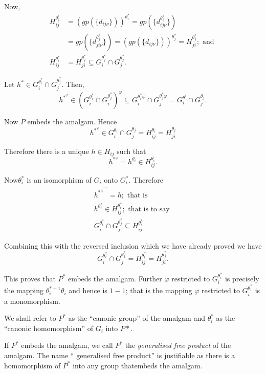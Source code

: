 Now,
\begin{align*}
  H^{\theta^*_i}_{ij} & = \left(gp( \big\{ d_{i j \nu} \big\})\right)^{\theta^*_i}
  = gp \left( \big\{ d^{\theta^*_i}_{i j \nu} \big\}\right)\\ 
  & = gp \left( \big\{ d^{\theta^*_j}_{ j i \nu} \big\}\right) =
  \left(gp( \big\{ d_{i j 
    \nu} \big\})\right)^{\theta^*_j} = H^{\theta^*_j}_{ji} ; \text{ and }\\ 
  H^{\theta^*_i}_{ij} & = H^{\theta^*_j}_{ji}  \subseteq
  G^{\theta^*_j}_{i} \cap  G^{\theta^*_j}_{j}. 
\end{align*}

Let $h^* \in G^{\theta^*_i}_{i}  \cap G^{\theta^*_j}_{j}$. Then,
$$
h^{*^ \varphi} \in ( G^{\theta^*_i}_{i} \cap
G^{\theta^*_j}_{i})^{\varphi} \subseteq G^{\theta^*_i \varphi}_{i}
\cap G^{\theta^*_j \varphi}_{j} = G^{\theta^i}_{i} \cap
G^{\theta_j}_{j}. 
$$

Now $P$ embeds the amalgam. Hence 
$$
h^{*^ \varphi} \in G^{\theta_i}_{i} \cap G^{\theta_j}_{j} =
H^{\theta_i}_{ij} = H^{\theta_j}_{ji} 
$$

Therefore there is a unique $h \in H_{i j}$ such that 
$$
h^{*{^\varphi}} = h^{\theta_i} \in H^{\theta_i}_{ij}.
$$

Now\pageoriginale ${\theta^*_i}$ is an isomorphism of $G_i$ onto $G^*_i$. Therefore 
\begin{gather*}
h^{\ast^{{\theta_i}^{\ast^{-1}}}} = h ; \text{ that is }\\
  h^{\theta^*_i} \in H^{\theta^*_i}_{ij} ; \text{ that is to say }\\
  G^{\theta^*_i}_{i} \cap G^{\theta^*_j}_{j} \subseteq H^{\theta^*_i}_{ij}
\end{gather*} 

Combining this with the reversed inclusion which we have already
proved we have  
$$
G^{\theta^*_i}_{i} \cap G^{\theta^*_j}_{j} = H^{\theta^*_i}_{ij} =
H^{\theta^*_j}_{ji}. 
$$

This proves that $P^*$ embeds the amalgam. Further $\varphi$
restricted to $G^{\theta^*_i}_{i}$ is precisely the mapping
${\theta^{*-1}_i} {\theta_i}$ and hence is $1-1$; that is the mapping
$\varphi$ restricted to $G^{\theta^*_i}_{i}$ is a monomorphism. 

We shall refer to $P^*$ as the ``canonic group'' of the amalgam and
${\theta^*_i}$ as the ``canonic homomorphism'' of $G_i$ into $P*$. 

If $P^*$ embeds the amalgam, we call $P^*$ the \textit{ generalised
  free product } of the amalgam. The name `` generalised free
product'' is justifiable as there is a homomorphism of $P^*$ into any
group that\pageoriginale embeds the amalgam. 


